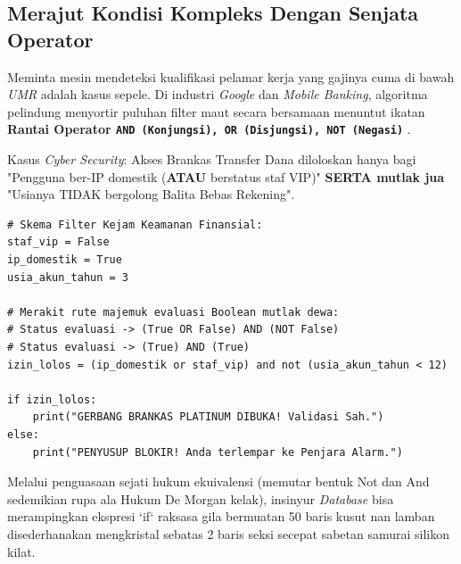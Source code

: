 \subsection{Merajut Kondisi Kompleks Dengan Senjata Operator}

Meminta mesin mendeteksi kualifikasi pelamar kerja yang gajinya cuma di bawah \textit{UMR} adalah kasus sepele. Di industri \textit{Google} dan \textit{Mobile Banking}, algoritma pelindung menyortir puluhan filter maut secara bersamaan menuntut ikatan \textbf{Rantai Operator \texttt{AND (Konjungsi), OR (Disjungsi), NOT (Negasi)}} \cite{python_docs_boolean}.

\begin{contoh}
Kasus \textit{Cyber Security}: Akses Brankas Transfer Dana diloloskan hanya bagi "Pengguna ber-IP domestik (\textbf{ATAU} berstatus staf VIP)" \textbf{SERTA mutlak jua} "Usianya TIDAK bergolong Balita Bebas Rekening".

\begin{lstlisting}[style=pythonstyle, caption={Operasi Filter Kejam Menyambung Operator Biner Terang}]
# Skema Filter Kejam Keamanan Finansial:
staf_vip = False
ip_domestik = True
usia_akun_tahun = 3

# Merakit rute majemuk evaluasi Boolean mutlak dewa:
# Status evaluasi -> (True OR False) AND (NOT False)
# Status evaluasi -> (True) AND (True)
izin_lolos = (ip_domestik or staf_vip) and not (usia_akun_tahun < 12)

if izin_lolos:
    print("GERBANG BRANKAS PLATINUM DIBUKA! Validasi Sah.")
else:
    print("PENYUSUP BLOKIR! Anda terlempar ke Penjara Alarm.")
\end{lstlisting}
Melalui penguasaan sejati hukum ekuivalensi (memutar bentuk Not dan And sedemikian rupa ala Hukum De Morgan kelak), insinyur \textit{Database} bisa merampingkan ekspresi `if` raksasa gila bermuatan 50 baris kusut nan lamban disederhanakan mengkristal sebatas 2 baris seksi secepat sabetan samurai silikon kilat.
\end{contoh}
